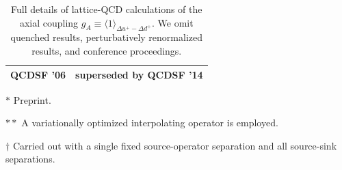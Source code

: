\begin{table}[!t]
\begin{threeparttable}
\begin{tabular}{llllll}
  QCDSF '06 \cite{Khan:2006de} &
  \multicolumn{5}{l}{superseded by QCDSF '14} \\
\bottomrule
\end{tabular}
\begin{tablenotes}
\scriptsize
\item[$*$] Preprint.
\item[$**$] A variationally optimized interpolating operator is employed.
\item[$\dagger$] Carried out with a single fixed source-operator separation 
and all source-sink separations.
\end{tablenotes}
\end{threeparttable}
\caption{\small Full details of lattice-QCD calculations of the axial 
coupling $g_A\equiv\langle 1\rangle_{\Delta u^+-\Delta d^+}$.
%
We omit quenched results, perturbatively renormalized results, and conference 
proceedings.}
\label{tab:latticebibfirst}
\end{table}


